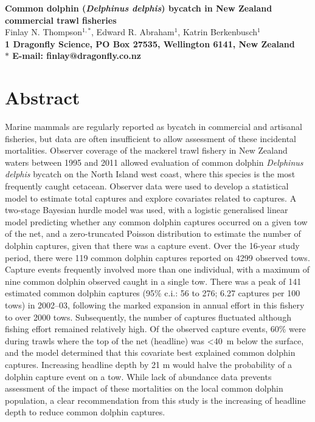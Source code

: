 \documentclass[10pt]{article}
\date{}
\begin{document}
\begin{flushleft}
{\Large
\textbf{Common dolphin (\emph{Delphinus delphis}) bycatch in New Zealand commercial trawl fisheries}}
\\
Finlay N. Thompson$^{1, \ast}$, 
Edward R. Abraham$^{1}$, 
Katrin Berkenbusch$^{1}$
\\
\bf{1} Dragonfly Science, PO Box 27535, Wellington 6141, New Zealand
\\
$\ast$ E-mail: finlay@dragonfly.co.nz
\end{flushleft}

\section*{Abstract}
Marine mammals are regularly reported as bycatch in commercial and
artisanal fisheries, but data are often insufficient to allow
assessment of these incidental mortalities. Observer coverage of the
mackerel trawl fishery in New Zealand waters between 1995 and 2011
allowed evaluation of common dolphin \emph{Delphinus delphis} bycatch
on the North Island west coast, where this species is the most
frequently caught cetacean.  Observer data were used to develop a
statistical model to estimate total captures and explore covariates
related to captures. A two-stage Bayesian hurdle model was used, with
a logistic generalised linear model predicting whether any common
dolphin captures occurred on a given tow of the net, and a zero-truncated Poisson distribution to estimate the number of dolphin captures, given that there was a capture event. Over the 16-year study period, there were 119 common dolphin captures reported on 4299  observed tows. Capture events frequently involved more than one individual, with a maximum of nine common dolphin observed caught in a single tow.  
There was a peak of 141 estimated common dolphin captures (95\% c.i.:
56 to 276; 6.27 captures per 100 tows) in \mbox{2002--03}, following the marked expansion in annual effort in this fishery to over 2000 tows.  Subsequently, the number of captures fluctuated
 although fishing effort remained relatively high.  Of the observed capture events, 60\% 
were during trawls where the top of the net (headline) was \textless 40~m below the surface, 
and the model determined that this covariate best  explained common dolphin captures. Increasing headline depth by 21 m would halve the probability of a dolphin capture event on a tow.  While lack of abundance data prevents assessment of the impact of these mortalities on the local common dolphin population, a clear recommendation from this study is the increasing of headline depth to reduce common dolphin captures.
\end{document}
